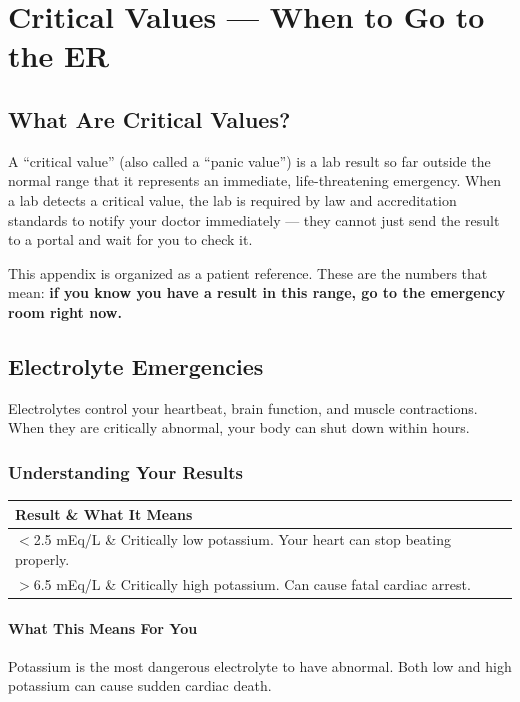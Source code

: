 \chapter{Critical Values --- When to Go to the ER}
\label{app:critical_values}

\clearpage
\section{What Are Critical Values?}

A ``critical value'' (also called a ``panic value'') is a lab result so far outside the normal range that it represents an immediate, life-threatening emergency. When a lab detects a critical value, the lab is required by law and accreditation standards to notify your doctor immediately --- they cannot just send the result to a portal and wait for you to check it.

This appendix is organized as a patient reference. These are the numbers that mean: \textbf{if you know you have a result in this range, go to the emergency room right now.}

\clearpage
\section{Electrolyte Emergencies}

Electrolytes control your heartbeat, brain function, and muscle contractions. When they are critically abnormal, your body can shut down within hours.

\subsection{Understanding Your Results}

\begin{longtable}{@{}ll@{}}
\toprule
\textbf{Result} \& \textbf{What It Means} \\
\midrule
$<$2.5 mEq/L \& Critically low potassium. Your heart can stop beating properly. \\
$>$6.5 mEq/L \& Critically high potassium. Can cause fatal cardiac arrest. \\
\bottomrule
\end{longtable}

\subsubsection{What This Means For You}

Potassium is the most dangerous electrolyte to have abnormal. Both low and high potassium can cause sudden cardiac death.

